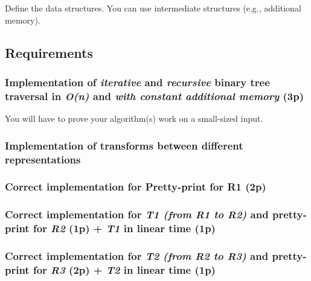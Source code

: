 \documentclass[../en-fa-lab.tex]{subfiles}
\begin{document}
Define the data structures. You can use intermediate structures (e.g.,
additional memory).

\subsection{Requirements}\label{requirements}

\subsubsection{\texorpdfstring{Implementation of \emph{iterative} and
\emph{recursive} binary tree traversal in \emph{O(n)} and \emph{with
constant additional memory}
(3p)}{Implementation of iterative and recursive binary tree traversal in O(n) and with constant additional memory (3p)}}\label{implementation-of-iterative-and-recursive-binary-tree-traversal-in-on-and-with-constant-additional-memory-3p}

You will have to prove your algorithm(s) work on a small-sized input.

\subsubsection{Implementation of transforms between different
representations}\label{implementation-of-transforms-between-different-representations}

\subsubsection{Correct implementation for Pretty-print for R1
(2p)}\label{correct-implementation-for-pretty-print-for-r1-2p}

\subsubsection{\texorpdfstring{Correct implementation for \emph{T1 (from R1
to R2)} and pretty-print for \emph{R2} (1p) + \emph{T1} in linear time
(1p)}{Correct implementation for T1 (from R1 to R2) and pretty-print for R2 (1p) + T1 in linear time (1p)}}\label{correct-implementation-for-t1-from-r1-to-r2-and-pretty-print-for-r2-1p-t1-in-linear-time-1p}

\subsubsection{\texorpdfstring{Correct implementation for \emph{T2}
\emph{(from R2 to R3)} and pretty-print for \emph{R3} (2p) + \emph{T2}
in linear time
(1p)}{Correct implementation for T2 (from R2 to R3) and pretty-print for R3 (2p) + T2 in linear time (1p)}}\label{correct-implementation-for-t2-from-r2-to-r3-and-pretty-print-for-r3-2p-t2-in-linear-time-1p}
\end{document}
